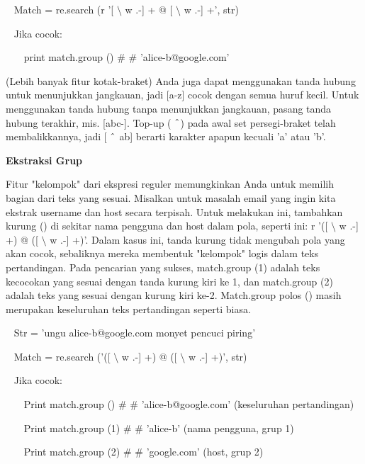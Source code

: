 \begin{12pt}
\begin{12pt}
\vspace{12pt}
\noindent 
~ Match = re.search (r '[ $  \setminus  $ w .-] + @ [ $  \setminus  $ w .-] +', str) \par
\noindent 
~ Jika cocok: \par
\noindent 
~~~ print match.group ()  $  \#  $ $  \#  $ 'alice-b@google.com' \par
\vspace{12pt}
(Lebih banyak fitur kotak-braket) Anda juga dapat menggunakan tanda hubung untuk menunjukkan jangkauan, jadi [a-z] cocok dengan semua huruf kecil. Untuk menggunakan tanda hubung tanpa menunjukkan jangkauan, pasang tanda hubung terakhir, mis. [abc-]. Top-up ( $  \string^  $) pada awal set persegi-braket telah membalikkannya, jadi [ $  \string^  $ ab] berarti karakter apapun kecuali 'a' atau 'b'. \par
\vspace{16pt}
{\fontsize{14pt}{14pt}\selectfont \textbf{Ekstraksi Grup} \\} \par
Fitur "kelompok" dari ekspresi reguler memungkinkan Anda untuk memilih bagian dari teks yang sesuai. Misalkan untuk masalah email yang ingin kita ekstrak username dan host secara terpisah. Untuk melakukan ini, tambahkan kurung () di sekitar nama pengguna dan host dalam pola, seperti ini: r '([ $  \setminus  $ w .-] +) @ ([ $  \setminus  $ w .-] +)'. Dalam kasus ini, tanda kurung tidak mengubah pola yang akan cocok, sebaliknya mereka membentuk "kelompok" logis dalam teks pertandingan. Pada pencarian yang sukses, match.group (1) adalah teks kecocokan yang sesuai dengan tanda kurung kiri ke 1, dan match.group (2) adalah teks yang sesuai dengan kurung kiri ke-2. Match.group polos () masih merupakan keseluruhan teks pertandingan seperti biasa. \par
\vspace{12pt}
\noindent 
~ Str = 'ungu alice-b@google.com monyet pencuci piring' \par
\noindent 
~ Match = re.search ('([ $  \setminus  $ w .-] +) @ ([ $  \setminus  $ w .-] +)', str) \par
\noindent 
~ Jika cocok: \par
\noindent 
~~~ Print match.group ()  $  \#  $ $  \#  $ 'alice-b@google.com' (keseluruhan pertandingan) \par
\noindent 
~~~ Print match.group (1)  $  \#  $ $  \#  $ 'alice-b' (nama pengguna, grup 1) \par
\noindent 
~~~ Print match.group (2)  $  \#  $ $  \#  $ 'google.com' (host, grup 2) \par

\end{12pt}
\end{12pt}

